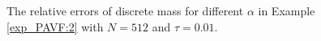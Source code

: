   \begin{figure}[H]
	\begin{center}
	 \caption{The relative errors of discrete mass for different $\alpha$ in Example \ref{exp_PAVF:2} with $N = 512$ and $\tau=0.01$.} \label{fig_PAVF:5}
	\end{center}
	\end{figure}
	
